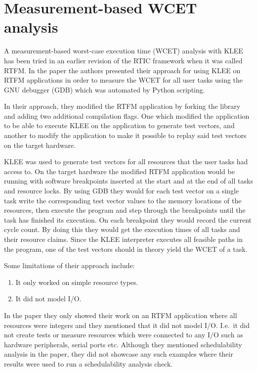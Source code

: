 \section{Measurement-based WCET analysis}
A measurement-based worst-case execution time (WCET) analysis with KLEE has
been tried in an earlier revision of the RTIC framework when it was called
RTFM\cite{lindner}. In the paper the authors presented their approach for using
KLEE on RTFM applications in order to measure the WCET for all user tasks
using the GNU debugger (GDB) which was automated by Python scripting.

In their approach, they modified the RTFM application by forking the library and
adding two additional compilation flags. One which modified the application to be
able to execute KLEE on the application to generate test vectors, and another
to modify the application to make it possible to replay said test vectors on
the target hardware.

KLEE was used to generate test vectors for all resources that the user tasks
had access to. On the target hardware the modified RTFM application would be
running with software breakpoints inserted at the start and at the end of all
tasks and resource locks. By using GDB they would for each test vector on a
single task write the corresponding test vector values to the memory locations
of the resources, then execute the program and step through the breakpoints
until the task has finished its execution. On each breakpoint they would record
the current cycle count. By doing this they would get the execution times of
all tasks and their resource claims. Since the KLEE interpreter executes all
feasible paths in the program, one of the test vectors should in theory yield
the WCET of a task.

Some limitations of their approach include:
\begin{enumerate}
    \item It only worked on simple resource types.
    \item It did not model I/O.
\end{enumerate}
In the paper they only showed their work on an RTFM application where all
resources were integers and they mentioned that it did not model I/O. I.e.\
it did not create tests or measure resources which were connected to any I/O
such as hardware peripherals, serial ports etc. Although they mentioned
schedulability analysis in the paper, they did not showcase any such examples
where their results were used to run a schedulability analysis check.

